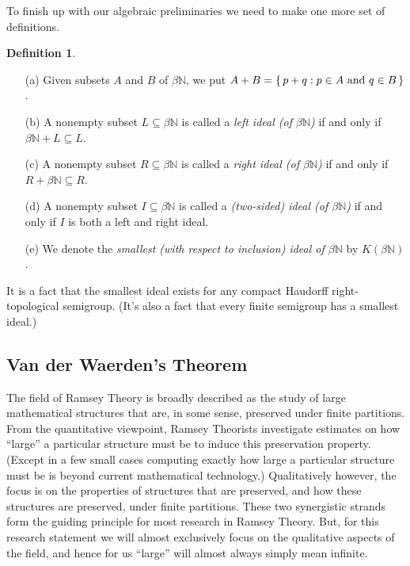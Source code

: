 \documentclass[12pt]{article}
\theoremstyle{plain}
\theoremstyle{definition}
\newtheorem{defn}[thm]{Definition}
\newcommand{\bbN}{\mathbb{N}}
\begin{document}
To finish up with our algebraic preliminaries we need to make one more
set of definitions.
  \begin{defn}
    \begin{itemize}
      \item[(a)] Given subsets $A$ and $B$ of $\beta\bbN$, we put $A +
        B = \{\, p+q : \hbox{$p \in A$ and $q \in B$} \,\}$.
      \item[(b)] A nonempty subset $L \subseteq \beta\bbN$ is called a
        \textsl{left ideal (of $\beta\bbN$)} if and only if $\beta\bbN
        + L \subseteq L$.
      \item[(c)] A nonempty subset $R \subseteq \beta\bbN$ is called a
        \textsl{right ideal (of $\beta\bbN$)} if and only if $R +
        \beta\bbN \subseteq R$.
      \item[(d)] A nonempty subset $I \subseteq \beta\bbN$ is called a
        \textsl{(two-sided) ideal (of $\beta\bbN$)} if and only if $I$
        is both a left and right ideal.
      \item[(e)] We denote the \textsl{smallest (with respect to
          inclusion) ideal of $\beta\bbN$} by $K(\beta\bbN)$.
    \end{itemize}
  \end{defn}
It is a fact\cite[Theorem 2.8]{Hindman:1998fk} that the smallest ideal
exists for any compact Haudorff right-topological semigroup. 
(It's also a fact that every finite semigroup has a smallest ideal.)

\subsection{Van der Waerden's Theorem}
The field of Ramsey Theory is broadly described as the study of large
mathematical structures that are, in some sense, preserved under
finite partitions.
From the quantitative viewpoint, Ramsey Theorists investigate
estimates on how ``large'' a particular structure must be to induce
this preservation property.
(Except in a few small cases computing exactly how large a particular
structure must be is beyond current mathematical technology.)
Qualitatively however, the focus is on the properties of structures that are preserved, and how these structures are preserved, under finite partitions.
These two synergistic strands form the guiding principle for most
research in Ramsey Theory.
But, for this research statement we will almost exclusively focus on
the qualitative aspects of the field, and hence for us ``large'' will
almost always simply mean infinite.
\end{document}

